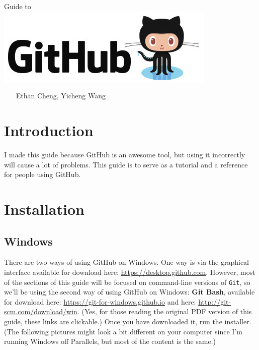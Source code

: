 \documentclass[11pt,fleqn]{article}
\theoremstyle{definition}
\begin{document}
\vspace*{\fill}
\begin{center}
{\Huge
Guide to \hspace{4.4cm} \texttt{ }
}\\
\includegraphics[scale=0.6]{GitHubLogo.jpg}
\end{center}
\begin{center}
\texttt{ } \newline
\texttt{ } \newline
Ethan Cheng, Yicheng Wang
\end{center}
\vspace*{\fill}

\newpage
\tableofcontents

\newpage
\section{Introduction}
I made this guide because GitHub is an awesome tool, but using it incorrectly
will cause a lot of problems. This guide is to serve as a tutorial and a
reference for people using GitHub.

\section{Installation}
\subsection{Windows}
There are two ways of using GitHub on Windows. One way is via the graphical
interface available for download here: \url{https://desktop.github.com}.
However, most of the sections of this guide will be focused on command-line
versions of \texttt{Git}, so we'll be using the second way of using GitHub on
Windows: \textbf{Git Bash}, available for download here:
\url{https://git-for-windows.github.io} and here:
\url{http://git-scm.com/download/win}. (Yes, for those reading the original PDF
version of this guide, these links are clickable.) Once you have downloaded it,
run the installer. (The following pictures might look a bit different on your
computer since I'm running Windows off Parallels, but most of the content is the
same.)
\end{document}
